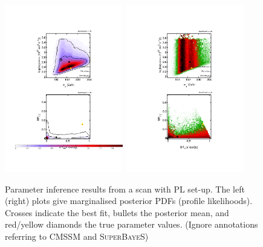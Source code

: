 \documentclass{article}
\begin{document}
\begin{figure}
\centering
\includegraphics[trim = 140 120 140 120, clip = true, width=0.46\textwidth]{figs/2D_Posterior_PLscan}
\includegraphics[trim = 140 120 140 120, clip = true, width=0.46\textwidth]{figs/2D_PL_PLscan}
\caption{Parameter inference results from a scan with PL set-up. The left (right) plots give marginalised posterior PDFs (profile likelihoods).  Crosses indicate the best fit, bullets the posterior mean, and red/yellow diamonds the true parameter values. (Ignore annotations referring to CMSSM and \textsc{SuperBayeS})}
\label{PLscan}
\end{figure} 
\end{document}
